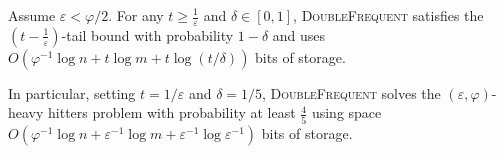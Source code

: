 \documentclass[sigconf,review=true,anonymous=true,screen]{acmart}
\newcommand{\ignore}[1]{}
\newcommand{\eps}{\varepsilon}
\renewcommand{\phi}{\varphi}
\begin{document}
\ignore{
	Proposed algorithm is simple algorithm with space complexity of $O(1/\varphi\log n + 1/\varepsilon\log {1/\varepsilon} + 1/\varepsilon \log s)$. In this proposed algorithm, upon picking item $x$ from stream S, If $x$ is already present in $\mathcal{T}_{1}$ then increment its counter value by 1.If $x$ is not present in $\mathcal{T}_{1}$ and $\mathcal{T}_{1}$ is not Full then put $x$ into $\mathcal{T}_{1}$ and make its counter value 1. If $x$ is not present in $\mathcal{T}_{1}$ and $\mathcal{T}_{1}$ is Full then decrement value for each counter value in $\mathcal{T}_{1}$ and if any counter value of some element say $y$ is zero then replace $y$ with $x$ and make $x$ counter value to be 1.
}
\begin{theorem}
Assume $\eps < \varphi/2$. For any $t \geq \frac1\eps$ and $\delta \in [0,1]$, \textsc{DoubleFrequent} satisfies the $\left(t-\frac1\eps\right)$-tail bound with probability $1-\delta$ and uses $O(\varphi^{-1} \log n + t \log m + t \log (t/\delta))$ bits of storage.

In particular, setting $t=1/\eps$ and $\delta=1/5$, \textsc{DoubleFrequent} solves the $(\eps,\varphi)$-heavy hitters problem with probability at least $\frac45$ using space $O(\varphi^{-1}\log n + \eps^{-1} \log m + \eps^{-1} \log \eps^{-1})$ bits of storage.

\ignore{
solves the $(\phi, 2\eps)$-Heavy hitters problem. In particular, for any $0\leq k \leq 1/\eps$, with probability at least $1-\delta$, for any $(x,\hat{f}_x)$ reported by the algorithm,
$$|f_x - \hat{f}_x| \leq \frac{F_1^{\text{res}(k)}}{1/\eps - k}$$
The algorithm uses $O(\phi^{-1} \log n + \eps^{-1} \log m)$ bits of storage.}
\end{theorem}
\end{document}
